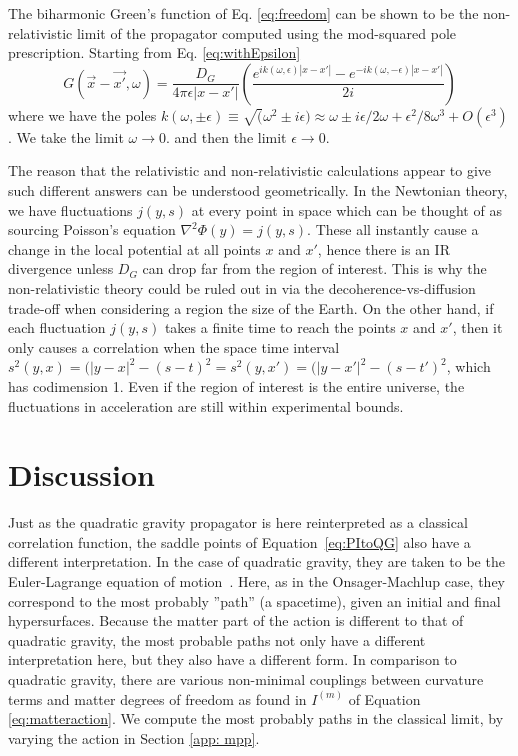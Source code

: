 \documentclass[aps,preprintnumbers,superscriptaddress,longbibliography]{revtex4-1}
\begin{document}
The biharmonic Green's function of Eq. \eqref{eq:freedom} can be shown to be the non-relativistic limit of the propagator computed using the mod-squared pole prescription. Starting from Eq. \eqref{eq:withEpsilon}
\begin{equation}
    G(\vec{x}-\vec{x'},\omega)=\frac{D_G}{4\pi \epsilon|x-x'|}\left(\frac{e^{ik(\omega,\epsilon)|x-x'|}-e^{-ik(\omega,-\epsilon)|x-x'|}}{2i}\right)
    \label{eq:withEpsilon}
\end{equation}
where we have the poles $k(\omega,\pm\epsilon)\equiv\sqrt(\omega^2\pm i\epsilon)\approx \omega\pm i\epsilon/2\omega+\epsilon^2/8\omega^3 + O(\epsilon^3)$. We take the limit $\omega\rightarrow 0$. and then the limit $\epsilon\rightarrow 0$. 

The reason that the relativistic and non-relativistic calculations appear to give such different answers can be understood geometrically. In the Newtonian theory, we have fluctuations $j(y,s)$ at every point in space which can be thought of as sourcing Poisson's equation $\nabla^2\Phi(y)=j(y,s)$. These all instantly cause a change in the local potential at all points $x$ and $x'$, hence there is an IR divergence unless $D_G$ can drop far from the region of interest. This is why the non-relativistic theory could be ruled out in \cite{oppenheim2022gravitationally} via the decoherence-vs-diffusion trade-off when considering a region the size of the Earth. On the other hand, if each fluctuation $j(y,s)$ takes a finite time to reach the points $x$ and $x'$, then it only causes a correlation when the space time interval $s^2(y,x)=(|y-x|^2-(s-t)^2=s^2(y,x')=(|y-x'|^2-(s-t')^2$, which has codimension 1.  Even if the region of interest is the entire universe, the fluctuations in acceleration are still within experimental bounds.

\section{Discussion}
\label{sec: discussion}


Just as the quadratic gravity propagator is here reinterpreted as a classical correlation function,
the saddle points of Equation~\eqref{eq:PItoQG} also have a different interpretation. In the case of quadratic gravity, they are taken to be the Euler-Lagrange equation of motion~\cite{stelle1977renormalization}. Here, as in the Onsager-Machlup case, they correspond to the most probably ''path'' (a spacetime), given an initial and final hypersurfaces. Because the matter part of the action is different to that of quadratic gravity, the most probable paths not only have a different interpretation here, but they also have a different form. In comparison to quadratic gravity, there are various non-minimal couplings between curvature terms and matter degrees of freedom as found in $I^{(m)}$ of Equation \eqref{eq:matteraction}. We compute the most probably paths in the classical limit, by varying the action in Section \ref{app: mpp}.
\end{document}
